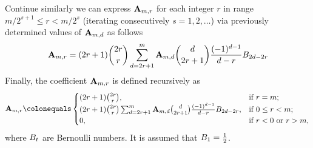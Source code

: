 Continue similarly we can express ${\mathbf{A}} \sb{m,r}$ for each integer $r$ in range $m/2^{s+1}\leq r < m/2^s$
(iterating consecutively $s=1,2,\ldots$) via previously determined values of ${\mathbf{A}} \sb{m,d}$ as follows
\begin{equation}
    {\mathbf{A}} \sb{m,r} =
    (2r+1) \binom{2r}{r} \sum_{d=2r+1}^{m} {\mathbf{A}} \sb{m,d} \binom{d}{2r+1} \frac{(-1)^{d-1}}{d-r}
    {B}\sb{2d-2r}\label{eq:equation12}
\end{equation}
Finally, the coefficient ${\mathbf{A}} \sb{m,r}$ is defined recursively as
\begin{equation}
    \label{eq:def_coeff_a}
    \coeffA{m}{r} \colonequals
    \begin{cases}
    (2r+1)
        \binom{2r}{r}, & \text{if } r=m; \\
        (2r+1) \binom{2r}{r} \sum_{d=2r+1}^{m} \coeffA{m}{d} \binom{d}{2r+1} \frac{(-1)^{d-1}}{d-r}
        \bernoulli{2d-2r}, & \text{if } 0 \leq r<m; \\
        0, & \text{if } r<0 \text{ or } r>m,
    \end{cases}
\end{equation}
where ${B}\sb{t}$ are Bernoulli numbers.
It is assumed that ${B}\sb{1}=\frac{1}{2}$.